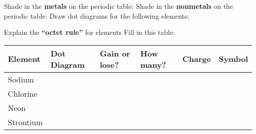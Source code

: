 \documentclass[10pt]{exam}
\begin{document}
\begin{questions}
  \question  Shade in the {\bf metals} on the periodic table: \ptable
  \question  Shade in the {\bf nonmetals} on the periodic table: \ptable
  \question  Draw dot diagrams for the following elements:
    \begin{multicols}{2}
    \end{multicols}
  \question Explain the {\bf ``octet rule''} for elements \vs
  \pagebreak
  \question Fill in this table:

  \renewcommand{\arraystretch}{4}

  \begin{center}
    \begin{tabular}{|l|l|l|l|p{5em}|p{5em}|}
    \hline
    Element & Dot Diagram & Gain or lose? & How many? & Charge & Symbol \\\hline
    Sodium & & & & & \\\hline
    Chlorine & & & & & \\\hline
    Neon & & & & & \\\hline
    Strontium & & & & & \\\hline
    \end{tabular}
    \end{center}
\end{questions}
\end{document}
